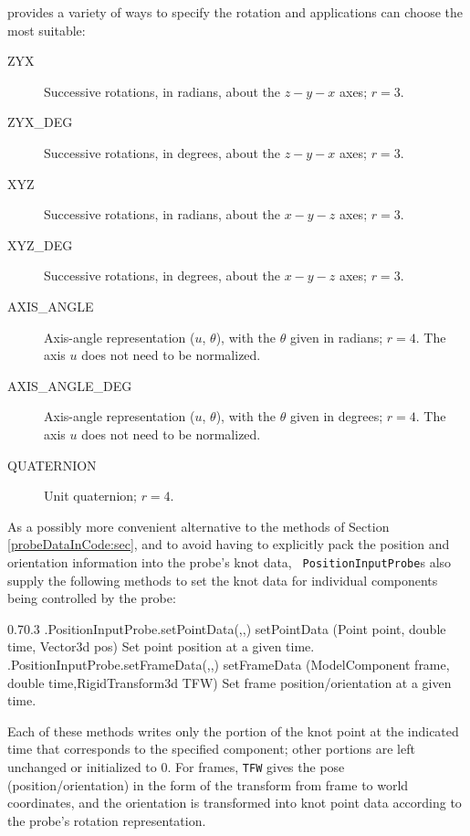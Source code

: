  provides a variety of ways
to specify the rotation and applications can choose the most suitable:

\begin{description}

\item[ZYX]\mbox{}

Successive rotations, in radians, about the $z-y-x$ axes; $r = 3$.

\item[ZYX\_DEG]\mbox{}

Successive rotations, in degrees, about the $z-y-x$ axes; $r = 3$.

\item[XYZ]\mbox{}

Successive rotations, in radians, about the $x-y-z$ axes; $r = 3$.

\item[XYZ\_DEG]\mbox{}

Successive rotations, in degrees, about the $x-y-z$ axes; $r = 3$.

\item[AXIS\_ANGLE]\mbox{}

Axis-angle representation ($u$, $\theta$), with the $\theta$ given in
radians; $r = 4$. The axis $u$ does not need to be normalized.

\item[AXIS\_ANGLE\_DEG]\mbox{}

Axis-angle representation ($u$, $\theta$), with the $\theta$ given in
degrees; $r = 4$. The axis $u$ does not need to be normalized.

\item[QUATERNION]\mbox{}

Unit quaternion; $r = 4$.

\end{description}

As a possibly more convenient alternative to the methods of
Section \ref{probeDataInCode:sec}, and to avoid having to explicitly pack the
position and orientation information into the probe's knot data, {\tt
PositionInputProbe}s also supply the following methods to set the knot data for
individual components being controlled by the probe:

%
\begin{methodtable}{0.7}{0.3}
\midline
%
\methodentry
{\probes.PositionInputProbe.setPointData(,,)}%
{setPointData (Point point, double time, Vector3d pos)}%
{Set point position at a given time.}%
%
\methodentry
{\probes.PositionInputProbe.setFrameData(,,)}%
{setFrameData (ModelComponent frame, double time,\brh RigidTransform3d TFW)}%
{Set frame position/orientation at a given time.}%
%
\midline
\end{methodtable}
%
Each of these methods writes only the portion of the knot point at the
indicated time that corresponds to the specified component; other portions are
left unchanged or initialized to 0. For frames, {\tt TFW} gives the pose
(position/orientation) in the form of the transform from frame to world
coordinates, and the orientation is transformed into knot point data according
to the probe's rotation representation.

